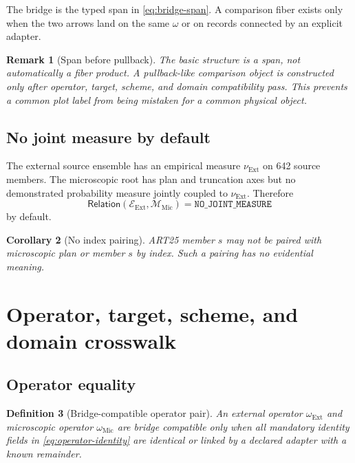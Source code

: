 \documentclass[11pt]{article}
\newtheorem{definition}{Definition}[section]
\newtheorem{corollary}[definition]{Corollary}
\newtheorem{remark}[definition]{Remark}
\newcommand{\cM}{\mathcal M}
\newcommand{\cE}{\mathcal E}
\newcommand{\Ext}{\ensuremath{\mathrm{Ext}}}
\newcommand{\Mic}{\ensuremath{\mathrm{Mic}}}
\begin{document}
The bridge is the typed span in \cref{eq:bridge-span}.  A comparison fiber exists only when the two arrows land on the same \(\omega\) or on records connected by an explicit adapter.

\begin{remark}[Span before pullback]
The basic structure is a span, not automatically a fiber product.  A pullback-like comparison object is constructed only after operator, target, scheme, and domain compatibility pass.  This prevents a common plot label from being mistaken for a common physical object.
\end{remark}

\subsection{No joint measure by default}

The external source ensemble has an empirical measure \(\nu_{\Ext}\) on 642 source members.  The microscopic root has plan and truncation axes but no demonstrated probability measure jointly coupled to \(\nu_{\Ext}\).  Therefore
\begin{equation}
 \mathsf{Relation}(\cE_{\Ext},\cM_{\Mic})
 =
 \texttt{NO\_JOINT\_MEASURE}
 \label{eq:no-joint-measure}
\end{equation}
by default.

\begin{corollary}[No index pairing]
ART25 member \(s\) may not be paired with microscopic plan or member \(s\) by index.  Such a pairing has no evidential meaning.
\end{corollary}

\section{Operator, target, scheme, and domain crosswalk}
\label{sec:crosswalk}

\subsection{Operator equality}

\begin{definition}[Bridge-compatible operator pair]
An external operator \(\omega_{\Ext}\) and microscopic operator \(\omega_{\Mic}\) are bridge compatible only when all mandatory identity fields in \cref{eq:operator-identity} are identical or linked by a declared adapter with a known remainder.
\end{definition}
\end{document}
